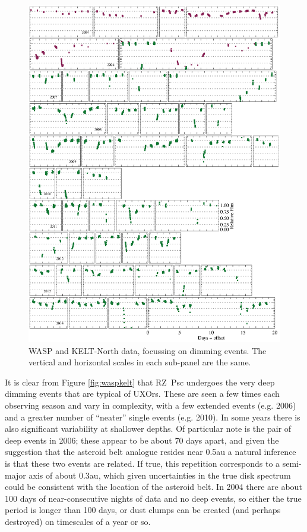 \documentclass[]{rsos}
\begin{document}
\begin{figure}
  \begin{center}
    \hspace{-0.5cm} \includegraphics[width=\textwidth]{figs/yearly-zoom.eps}
    \caption{WASP and KELT-North data, focussing on dimming events. The vertical and
      horizontal scales in each sub-panel are the same.}\label{fig:waspkeltzoom}
  \end{center}
\end{figure}

It is clear from Figure \ref{fig:waspkelt} that RZ~Psc undergoes the very deep dimming
events that are typical of UXOrs. These are seen a few times each observing season and
vary in complexity, with a few extended events (e.g. 2006) and a greater number of
``neater'' single events (e.g. 2010). In some years there is also significant variability
at shallower depths. Of particular note is the pair of deep events in 2006; these appear
to be about 70 days apart, and given the suggestion that the asteroid belt analogue
resides near 0.5au a natural inference is that these two events are related. If true,
this repetition corresponds to a semi-major axis of about 0.3au, which given
uncertainties in the true disk spectrum could be consistent with the location of the
asteroid belt. In 2004 there are about 100 days of near-consecutive nights of data and no
deep events, so either the true period is longer than 100 days, or dust clumps can be
created (and perhaps destroyed) on timescales of a year or so.
\end{document}
